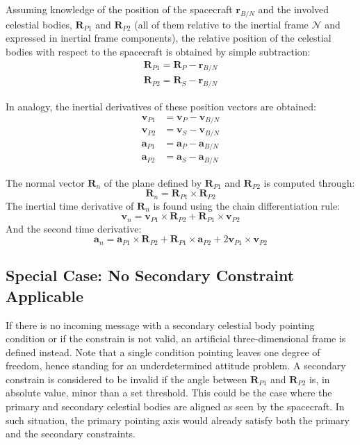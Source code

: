 Assuming knowledge of the position of the spacecraft $\bm{r}_{B/N}$ and the involved celestial bodies, $\bm{R}_{P1}$ and  $\bm{R}_{P2}$ (all of them relative to the inertial frame $\mathcal{N}$ and expressed in inertial frame components), the relative position of the celestial bodies with respect to the spacecraft is obtained by simple subtraction:
\begin{subequations}
	\begin{align}
		 \bm{R}_{P1} =\bm{R}_{P} - \bm{r}_{B/N} \\
		 \bm{R}_{P2} =\bm{R}_{S} - \bm{r}_{B/N} 
	\end{align}
\end{subequations}

In analogy, the inertial derivatives of these position vectors are obtained:
\begin{subequations}
	\begin{align}
		 \bm{v}_{P1} &=\bm{v}_{P} - \bm{v}_{B/N} \\
		 \bm{v}_{P2} &=\bm{v}_{S} - \bm{v}_{B/N} \\
		 \bm{a}_{P1} &=\bm{a}_{P} - \bm{a}_{B/N} \\
		 \bm{a}_{P2} &=\bm{a}_{S} - \bm{a}_{B/N} 
	\end{align}
\end{subequations}

The normal vector $\bm{R}_{n}$ of the plane defined by $\bm{R}_{P1}$ and $\bm{R}_{P2}$ is computed through:
\begin{equation}
	\bm R_{n} =\bm{R}_{P1} \times \bm{R}_{P2}
\end{equation}
The inertial time derivative of $\bm{R}_n$ is found using the chain differentiation rule:
\begin{equation}
	\bm {v}_{n} = \bm{v}_{P1} \times \bm{R}_{P2} + \bm{R}_{P1} \times \bm{v}_{P2} 
\end{equation}
And the second time derivative:
\begin{equation}
	\bm {a}_{n} = \bm{a}_{P1} \times \bm{R}_{P2} + \bm{R}_{P1} \times \bm{a}_{P2}  + 2 \bm{v}_{P1} \times \bm{v}_{P2} 
\end{equation}
\subsection{ Special Case: No Secondary Constraint Applicable}
If there is no incoming message with a secondary celestial body pointing condition or if the constrain is not valid, an artificial three-dimensional frame is defined instead. Note that a single condition pointing leaves one degree of freedom, hence standing for an underdetermined attitude problem. A secondary constrain is considered to be invalid if the angle between $\bm{R}_{P1}$ and $\bm{R}_{P2}$ is, in absolute value, minor than a set threshold. This could be the case where the primary and secondary celestial bodies are aligned as seen by the spacecraft. In such situation, the primary pointing axis would already satisfy both the primary and the secondary constraints.

